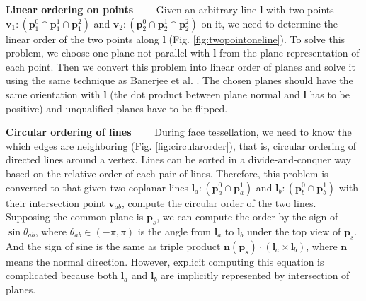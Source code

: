 \documentclass[10pt,journal,compsoc]{IEEEtran}
\begin{document}
\vspace{0.5em}
\noindent \textbf{Linear ordering on points}~~~~
Given an arbitrary line $\bm{l}$ with two points $\bm{v}_1\colon(\bm{p}_1^0\cap\bm{p}_1^1\cap\bm{p}_1^2)$ and $\bm{v}_2\colon(\bm{p}_2^0\cap\bm{p}_2^1\cap\bm{p}_2^2)$ on it, we need to determine the linear order of the two points along $\bm{l}$ (Fig. \ref{fig:twopointoneline}). To solve this problem, we choose one plane not parallel with $\bm{l}$ from the plane representation of each point. Then we convert this problem into linear order of planes and solve it using the same technique as Banerjee et al. \cite{banerjee1996topologically}. The chosen planes should have the same orientation with $\bm{l}$ (the dot product between plane normal and $\bm{l}$ has to be positive) and unqualified planes have to be flipped.


\vspace{0.5em}
\noindent \textbf{Circular ordering of lines}~~~~
During face tessellation, we need to know the which edges are neighboring (Fig. \ref{fig:circularorder}), that is, circular ordering of directed lines around a vertex. Lines can be sorted in a divide-and-conquer way based on the relative order of each pair of lines. Therefore, this problem is converted to that given two coplanar lines $\bm{l}_a\colon(\bm{p}_a^0\cap\bm{p}_a^1)$ and $\bm{l}_b\colon(\bm{p}_b^0\cap\bm{p}_b^1)$ with their intersection point $\bm{v}_{ab}$, compute the circular order of the two lines. Supposing the common plane is $\bm{p}_s$, we can compute the order by the sign of $\sin{\theta_{ab}}$, where $\theta_{ab}\in(-\pi,\pi)$ is the angle from $\bm{l}_a$ to $\bm{l}_b$ under the top view of $\bm{p}_s$. And the sign of sine is the same as triple product $\bm{n}(\bm{p}_s) \cdot (\bm{l}_a\times\bm{l}_b)$,
where $\bm{n}$ means the normal direction. However, explicit computing this equation is complicated because both $\bm{l}_a$ and $\bm{l}_b$ are implicitly represented by intersection of planes.
\end{document}
